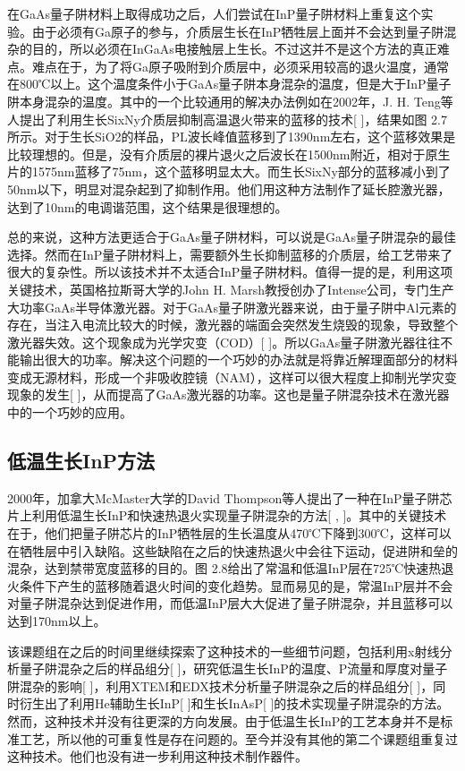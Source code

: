 \documentclass[oneside]{ZJUthesis}
\begin{document}
在GaAs量子阱材料上取得成功之后，人们尝试在InP量子阱材料上重复这个实验。由于必须有Ga原子的参与，介质层生长在InP牺牲层上面并不会达到量子阱混杂的目的，所以必须在InGaAs电接触层上生长。不过这并不是这个方法的真正难点。难点在于，为了将Ga原子吸附到介质层中，必须采用较高的退火温度，通常在800℃以上。这个温度条件小于GaAs量子阱本身混杂的温度，但是大于InP量子阱本身混杂的温度。其中的一个比较通用的解决办法例如在2002年，J. H. Teng等人提出了利用生长SixNy介质层抑制高温退火带来的蓝移的技术[ ]，结果如图 2.7所示。对于生长SiO2的样品，PL波长峰值蓝移到了1390nm左右，这个蓝移效果是比较理想的。但是，没有介质层的裸片退火之后波长在1500nm附近，相对于原生片的1575nm蓝移了75nm，这个蓝移明显太大。而生长SixNy部分的蓝移减小到了50nm以下，明显对混杂起到了抑制作用。他们用这种方法制作了延长腔激光器，达到了10nm的电调谐范围，这个结果是很理想的。

总的来说，这种方法更适合于GaAs量子阱材料，可以说是GaAs量子阱混杂的最佳选择。然而在InP量子阱材料上，需要额外生长抑制蓝移的介质层，给工艺带来了很大的复杂性。所以该技术并不太适合InP量子阱材料。值得一提的是，利用这项关键技术，英国格拉斯哥大学的John H. Marsh教授创办了Intense公司，专门生产大功率GaAs半导体激光器。对于GaAs量子阱激光器来说，由于量子阱中Al元素的存在，当注入电流比较大的时候，激光器的端面会突然发生烧毁的现象，导致整个激光器失效。这个现象成为光学灾变（COD）[ ]。所以GaAs量子阱激光器往往不能输出很大的功率。解决这个问题的一个巧妙的办法就是将靠近解理面部分的材料变成无源材料，形成一个非吸收腔镜（NAM），这样可以很大程度上抑制光学灾变现象的发生[ ]，从而提高了GaAs激光器的功率。这也是量子阱混杂技术在激光器中的一个巧妙的应用。

\subsection{低温生长InP方法}

2000年，加拿大McMaster大学的David Thompson等人提出了一种在InP量子阱芯片上利用低温生长InP和快速热退火实现量子阱混杂的方法[ , ]。其中的关键技术在于，他们把量子阱芯片的InP牺牲层的生长温度从470℃下降到300℃，这样可以在牺牲层中引入缺陷。这些缺陷在之后的快速热退火中会往下运动，促进阱和垒的混杂，达到禁带宽度蓝移的目的。图 2.8给出了常温和低温InP层在725℃快速热退火条件下产生的蓝移随着退火时间的变化趋势。显而易见的是，常温InP层并不会对量子阱混杂达到促进作用，而低温InP层大大促进了量子阱混杂，并且蓝移可以达到170nm以上。

该课题组在之后的时间里继续探索了这种技术的一些细节问题，包括利用x射线分析量子阱混杂之后的样品组分[ ]，研究低温生长InP的温度、P流量和厚度对量子阱混杂的影响[ ]，利用XTEM和EDX技术分析量子阱混杂之后的样品组分[ ]，同时衍生出了利用He辅助生长InP[ ]和生长InAsP[ ]的技术实现量子阱混杂的方法。然而，这种技术并没有往更深的方向发展。由于低温生长InP的工艺本身并不是标准工艺，所以他的可重复性是存在问题的。至今并没有其他的第二个课题组重复过这种技术。他们也没有进一步利用这种技术制作器件。
\end{document}

